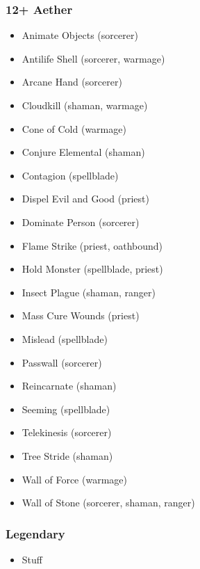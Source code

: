 \subsubsection{12+ Aether}
\begin{itemize}
\item Animate Objects (sorcerer)
\item Antilife Shell (sorcerer, warmage)
\item Arcane Hand (sorcerer)
\item Cloudkill (shaman, warmage)
\item Cone of Cold (warmage)
\item Conjure Elemental (shaman)
\item Contagion (spellblade)
\item Dispel Evil and Good (priest)
\item Dominate Person (sorcerer)
\item Flame Strike (priest, oathbound)
\item Hold Monster (spellblade, priest)
\item Insect Plague (shaman, ranger)
\item Mass Cure Wounds (priest)
\item Mislead (spellblade)
\item Passwall (sorcerer)
\item Reincarnate (shaman)
\item Seeming (spellblade)
\item Telekinesis (sorcerer)
\item Tree Stride (shaman)
\item Wall of Force (warmage)
\item Wall of Stone (sorcerer, shaman, ranger)
\end{itemize}

\subsubsection{Legendary}
\begin{itemize}
    \item Stuff
\end{itemize}





